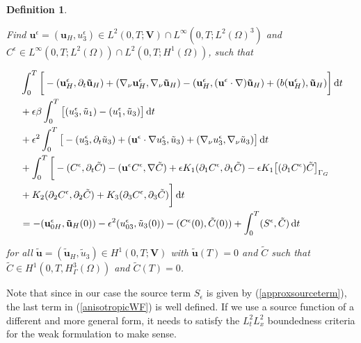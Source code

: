 \documentclass[11pt]{article}
\newtheorem{definition}{Definition}
\newcommand*\diff{\mathop{}\!\mathrm{d}}
\begin{document}
  \begin{definition} \label{definitionanisotropicWF}
  
  Find $\mathbf{u}^\epsilon = (\mathbf{u}_H, u^\epsilon_3) \in L^2 (0,T ; \mathbf{V}) \cap L^\infty (0, T; L^2 (\Omega)^3)$ and $C^\epsilon \in L^\infty (0,T; L^2(\Omega)) \cap L^2 (0,T; H^1(\Omega))$, such that
  
  \begin{equation}
    \begin{split}
      & \int_0^T \bigg [ -(\mathbf{u}^\epsilon_H, \partial_t \mathbf{\tilde{u}}_H) + (\nabla_\nu \mathbf{u}^\epsilon_H, \nabla_\nu \mathbf{\tilde{u}}_H) - (\mathbf{u}^\epsilon_H, (\mathbf{u}^\epsilon \cdot \nabla) \mathbf{\tilde{u}}_H) + (b(\mathbf{u}^\epsilon_H), \mathbf{\tilde{u}}_H) \bigg ] \diff t \\
      & + \epsilon \beta \int_0 ^ T \big [ (u_3 ^\epsilon, \tilde{u}_1) - (u_1^\epsilon, \tilde{u}_3) \big ] \diff t\\
      & + \epsilon^2 \int _0 ^ T \big [ -(u_3^\epsilon, \partial_t \tilde{u}_3) +(\mathbf{u}^\epsilon \cdot \nabla u_3 ^ \epsilon, \tilde{u}_3) + (\nabla_\nu u_3^\epsilon, \nabla_\nu \tilde{u}_3) \big ] \diff t \\
      & + \int_0^T \bigg [ -(C^\epsilon, \partial_t \tilde{C}) -(\mathbf{u}^\epsilon C^\epsilon, \nabla \tilde{C}) + \epsilon K_1 (\partial_1 C^\epsilon, \partial_1 \tilde{C}) - \epsilon K_1 \big[(\partial_1 C^\epsilon) \tilde{C} \big] _{\Gamma_G} \\
      & + K_2 (\partial_2 C^\epsilon, \partial_2 \tilde{C}) + K_3 (\partial_3 C^\epsilon, \partial_3 \tilde{C}) \bigg ] \diff t \\
      & = - (\mathbf{u}^\epsilon_{0H}, \mathbf{\tilde{u}}_H(0)) - \epsilon^2 (u_{03}^\epsilon, \tilde{u}_3 (0)) - (C^\epsilon (0), \tilde{C} (0)) + \int_0^T (S^\epsilon,\tilde{C}) \diff t \raisetag{20pt} \label{anisotropicWF}
    \end{split}
  \end{equation}
  
  for all $\mathbf{\tilde{u}} = (\mathbf{\tilde{u}}_H, \tilde{u}_3) \in H^1 (0,T;\mathbf{V})$ with $\mathbf{\tilde{u}}(T) = 0$ and $\tilde{C}$ such that $\tilde{C} \in H^1 (0,T, H^3_{\Gamma} (\Omega))$ and $\tilde{C} (T) = 0$.
  
  \end{definition}
  
  Note that since in our case the source term $S_\epsilon$ is given by (\ref{approxsourceterm}), the last term in (\ref{anisotropicWF}) is well defined. If we use a source function of a different and more general form, it needs to satisfy the $L_t^2 L_x^2$ boundedness criteria for the weak formulation to make sense.
\end{document}
